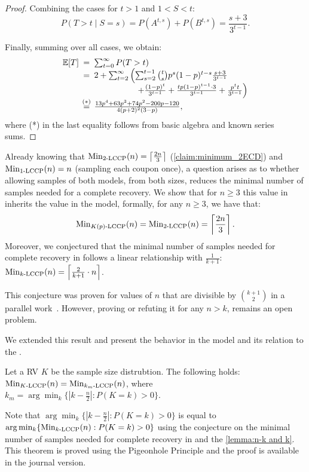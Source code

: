 \begin{proof}
Combining the cases for $t > 1$ and $1 < S < t$:
\vspace{-1ex}
\[
P(T > t \mid S = s) 
=
P(A^{t,s}) 
+
P(B^{t,s}) 
=
\frac{s +3}{3^{t-1}}.
\]

Finally, summing over all cases, we obtain:
\[\begin{array}{l@{\hspace{0.4em}}c@{\hspace{0.4em}}l}
\mathbb{E}[T] 
&=& 
\sum_{t=0}^\infty P(T > t) 
\\& = &
2
+ 
\sum_{t=2}^\infty 
    \left(
    \sum_{s=2}^{t-1}
    \binom{t}{s} p^s (1-p)^{t-s} \frac{s +3}{3^{t-1}}
        \right. \\&& \left. \hspace{1.8cm}
        + \frac{(1-p)^t}{3^{t-1}} + \frac{t p (1-p)^{t-1} \cdot 3}{3^{t-1}} + \frac{p^t t}{3^{t-1}} 
    \right)
\\&\stackrel{(*)}{=}& 
\frac
{13p^4 + 63p^3 + 74p^2 - 200p - 120}
{4(p+2)^2(3-p)},
\end{array} 
\]
where (*) in the last equality follows from basic algebra and known series sums.
\end{proof}

Already knowing that $\Min{\kecd{2}{n}}{n} = \left\lceil \frac{2n}{3}\right\rceil$ (\autoref{claim:minimum_2ECD}) and $\Min{\kecd{1}{n}}{n} = n$ (sampling each coupon once), a question arises as to whether allowing samples of both models, from both sizes, reduces the minimal number of samples needed for a complete recovery. We show that for $n \geq 3$ this value in  inherits the value in the  model, formally, for any $n \geq 3$, we have that: 
$$
\Min{\fmecd{K(p)}{}{n}}{n} = \Min{\kecd{2}{n}}{n} = \left\lceil \frac{2n}{3}\right\rceil.
$$
Moreover, we conjectured that the minimal number of samples needed for complete recovery in \ekecd follows a linear relationship with $\frac{1}{k+1}$:
$
        \Min{\kecd{k}{n}}{n} = \left\lceil\frac{2}{k+1} \cdot n \right\rceil 
$.

This conjecture
was proven for values of $n$ that are divisible by $\binom{k+1}{2}$ in a parallel work~\cite{barlev2024}.
However, proving or refuting it for any $n > k$,  remains an open problem.

We extended this result and present the behavior in the \efmecd model and its relation to the \ekecd.
\begin{theorem}
\label{conjecture:minimal:MECD}
    Let a RV $K$ be the sample size distrubtion.
    The following holds:
    $\Min{\fmecd{K}{}{n}}{n} = \Min{\kecd{k_m}{n}}{n}$,
    where $k_m=\arg\min_{k}\{|k - \frac{n}{2}| : P(K=k)>0\}$.
\end{theorem}
Note that
$\arg\min_{k}\{|k - \frac{n}{2}| : P(K=k)>0 \}$
is equal to
$\arg\min_{k}\{\Min{\kecd{k}{n}}{n} : P(K=k)>0\}$
using the conjecture on the minimal number of samples needed for complete recovery in \ekecd and the \autoref{lemma:n-k and k}.
This theorem is proved using the Pigeonhole Principle and the proof is available in the journal version.

